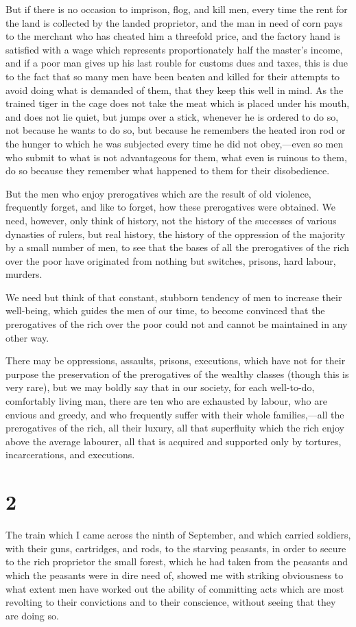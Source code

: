 \documentclass{book}
\begin{document}
But if there is no occasion to imprison, flog, and kill men, every time the rent for the land is collected by the landed proprietor, and the man in need of corn pays to the merchant who has cheated him a threefold price, and the factory hand is satisfied with a wage which represents proportionately half the master’s income, and if a poor man gives up his last rouble for customs dues and taxes, this is due to the fact that so many men have been beaten and killed for their attempts to avoid doing what is demanded of them, that they keep this well in mind. As the trained tiger in the cage does not take the meat which is placed under his mouth, and does not lie quiet, but jumps over a stick, whenever he is ordered to do so, not because he wants to do so, but because he remembers the heated iron rod or the hunger to which he was subjected every time he did not obey,—even so men who submit to what is not advantageous for them, what even is ruinous to them, do so because they remember what happened to them for their disobedience.

But the men who enjoy prerogatives which are the result of old violence, frequently forget, and like to forget, how these prerogatives were obtained. We need, however, only think of history, not the history of the successes of various dynasties of rulers, but real history, the history of the oppression of the majority by a small number of men, to see that the bases of all the prerogatives of the rich over the poor have originated from nothing but switches, prisons, hard labour, murders.

We need but think of that constant, stubborn tendency of men to increase their well-being, which guides the men of our time, to become convinced that the prerogatives of the rich over the poor could not and cannot be maintained in any other way.

There may be oppressions, assaults, prisons, executions, which have not for their purpose the preservation of the prerogatives of the wealthy classes (though this is very rare), but we may boldly say that in our society, for each well-to-do, comfortably living man, there are ten who are exhausted by labour, who are envious and greedy, and who frequently suffer with their whole families,—all the prerogatives of the rich, all their luxury, all that superfluity which the rich enjoy above the average labourer, all that is acquired and supported only by tortures, incarcerations, and executions.

\section*{2}
The train which I came across the ninth of September, and which carried soldiers, with their guns, cartridges, and rods, to the starving peasants, in order to secure to the rich proprietor the small forest, which he had taken from the peasants and which the peasants were in dire need of, showed me with striking obviousness to what extent men have worked out the ability of committing acts which are most revolting to their convictions and to their conscience, without seeing that they are doing so.
\end{document}
